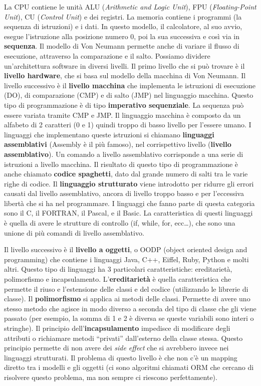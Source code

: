 La CPU contiene le unità ALU (\textit{Arithmetic and Logic Unit}), FPU (\textit{Floating-Point Unit}), CU (\textit{Control Unit}) e dei registri. La memoria contiene i programmi (la sequenza di istruzioni) e i dati. In questo modello, il calcolatore, al suo avvio, esegue l’istruzione alla posizione numero 0, poi la sua successiva e così via in \textbf{sequenza}. Il modello di Von Neumann permette anche di variare il flusso di esecuzione, attraverso la comparazione e il salto. Possiamo dividere un’architettura software in diversi livelli. Il primo livello che si può trovare è il \textbf{livello hardware}, che si basa sul modello della macchina di Von Neumann. Il livello successivo è il \textbf{livello macchina} che implementa le istruzioni di esecuzione (DO), di comparazione (CMP) e di salto (JMP) nel linguaggio macchina. Questo tipo di programmazione è di tipo \textbf{imperativo sequenziale}. La sequenza può essere variata tramite CMP e JMP. Il linguaggio macchina è composto da un alfabeto di 2 caratteri (0 e 1) quindi troppo di basso livello per l’essere umano. I linguaggi che implementano queste istruzioni si chiamano \textbf{linguaggi assemblativi} (Assembly è il più famoso), nel corrispettivo livello (\textbf{livello assemblativo}). Un comando a livello assemblativo corrisponde a una serie di istruzioni a livello macchina. Il risultato di questo tipo di programmazione è anche chiamato \textbf{codice spaghetti}, dato dal grande numero di salti tra le varie righe di codice. Il \textbf{linguaggio strutturato} viene introdotto per ridurre gli errori causati dal livello assemblativo, ancora di livello troppo basso e per l’eccessiva libertà che si ha nel programmare. I linguaggi che fanno parte di questa categoria sono il C, il FORTRAN, il Pascal, e il Basic. La caratteristica di questi linguaggi è quella di avere le strutture di controllo (if, while, for, ecc…), che sono una unione di più comandi di livello assemblativo. 
   
Il livello successivo è il \textbf{livello a oggetti}, o OODP (object oriented design and programming) che contiene i linguaggi Java, C++, Eiffel, Ruby, Python e molti altri. Questo tipo di linguaggi ha 3 particolari caratteristiche: ereditarietà, polimorfismo e incapsulamento. L’\textbf{ereditarietà} è quella caratteristica che permette il riuso e l’estensione delle classi e del codice (utilizzando le librerie di classe). Il \textbf{polimorfismo} si applica ai metodi delle classi. Permette di avere uno stesso metodo che agisce in modo diverso a seconda del tipo di classe che gli viene passato (per esempio, la somma di 1 e 2 è diversa se queste variabili sono interi o stringhe). Il principio dell’\textbf{incapsulamento} impedisce di modificare degli attributi o richiamare metodi “privati” dall’esterno della classe stessa. Questo principio permette di non avere dei \textit{side effect} che si avrebbero invece nei linguaggi strutturati. Il problema di questo livello è che non c’è un mapping diretto tra i modelli e gli oggetti (ci sono algoritmi chiamati ORM che cercano di risolvere questo problema, ma non sempre ci riescono perfettamente). 

